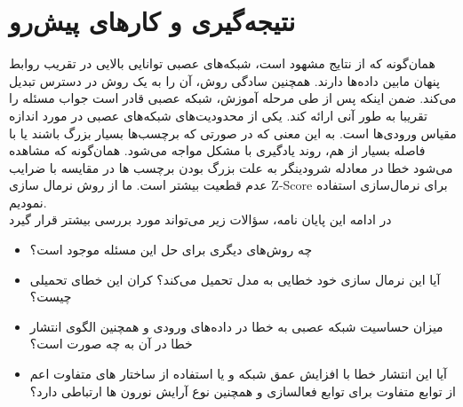 \section*{نتیجه‌گیری و کارهای پیش‌رو}
همان‌گونه که از نتایج مشهود است، شبکه‌های عصبی توانایی بالایی در تقریب روابط پنهان مابین داده‌ها دارند. همچنین سادگی روش، آن را به یک روش در دسترس تبدیل می‌کند. ضمن اینکه پس از طی مرحله آموزش، شبکه عصبی قادر است جواب مسئله را تقریبا به طور آنی ارائه کند. یکی از محدودیت‌های شبکه‌های عصبی در مورد اندازه مقیاس ورودی‌ها است. به این معنی که در صورتی که برچسب‌ها بسیار بزرگ باشند یا با فاصله بسیار از هم، روند یادگیری با مشکل مواجه می‌شود. همان‌گونه که مشاهده می‌شود خطا در معادله شرودینگر به علت بزرگ بودن برچسب ها در مقایسه با ضرایب عدم قطعیت بیشتر است. ما از روش نرمال سازی Z-Score برای نرمال‌سازی استفاده نمودیم.\\
در ادامه این پایان نامه، سؤالات زیر می‌تواند مورد بررسی بیشتر قرار گیرد
\begin{itemize}
	\item چه روش‌های دیگری برای حل این مسئله موجود است؟
	\item آیا این نرمال سازی خود خطایی به مدل تحمیل می‌کند؟ کران این خطای تحمیلی چیست؟
	\item میزان حساسیت شبکه عصبی به خطا در داده‌های ورودی و همچنین الگوی انتشار خطا در آن به چه صورت است؟
	\item آیا این انتشار خطا با افزایش عمق شبکه و یا استفاده از ساختار های متفاوت اعم از توابع متفاوت برای توابع فعالسازی و همچنین نوع آرایش نورون ها ارتباطی دارد؟
\end{itemize}
\clearpage
\newpage